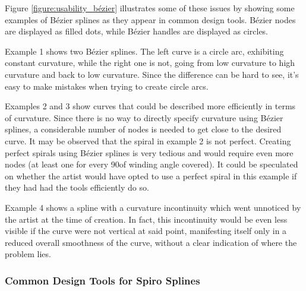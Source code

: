 \documentclass[a4paper]{article}
\begin{document}
				Figure \ref{figure:usability_bézier} illustrates some of these issues by showing some examples of Bézier splines as they appear in common design tools. Bézier nodes are displayed as filled dots, while Bézier handles are displayed as circles.

				Example 1 shows two Bézier splines. The left curve is a circle arc, exhibiting constant curvature, while the right one is not, going from low curvature to high curvature and back to low curvature. Since the difference can be hard to see, it's easy to make mistakes when trying to create circle arcs.

				Examples 2 and 3 show curves that could be described more efficiently in terms of curvature. Since there is no way to directly specify curvature using Bézier splines, a considerable number of nodes is needed to get close to the desired curve. It may be observed that the spiral in example 2 is not perfect. Creating perfect spirals using Bézier splines is very tedious and would require even more nodes (at least one for every 90\textdegree of winding angle covered). It could be speculated on whether the artist would have opted to use a perfect spiral in this example if they had had the tools efficiently do so.

				Example 4 shows a spline with a curvature incontinuity which went unnoticed by the artist at the time of creation. In fact, this incontinuity would be even less visible if the curve were not vertical at said point, manifesting itself only in a reduced overall smoothness of the curve, without a clear indication of where the problem lies.

			\subsubsection{Common Design Tools for Spiro Splines}

\end{document}

